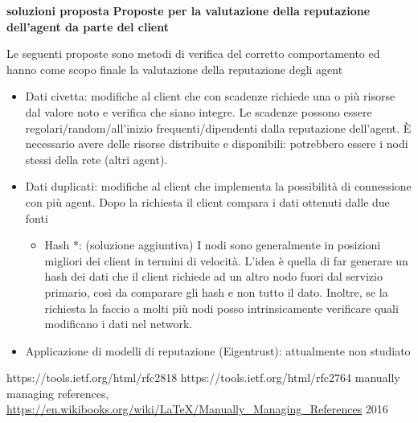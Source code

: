 \documentclass[]{article}
\begin{document}
	\textbf{soluzioni proposta}
	\textbf{Proposte per la valutazione della reputazione dell'agent da parte del client}
	
	Le seguenti proposte sono metodi di verifica del corretto comportamento ed hanno come scopo finale la valutazione della reputazione degli agent
	\begin{itemize}
		\item Dati civetta: modifiche al client che con scadenze richiede una o più risorse dal valore noto e verifica che siano integre. Le scadenze possono essere regolari/random/all’inizio frequenti/dipendenti dalla reputazione dell’agent. È necessario avere delle risorse distribuite e disponibili: potrebbero essere i nodi stessi della rete (altri agent).
		\item Dati duplicati: modifiche al client che implementa la possibilità di connessione con più agent. Dopo la richiesta il client compara i dati ottenuti dalle due fonti
		\begin{itemize}
			\item Hash *: (soluzione aggiuntiva) I nodi sono generalmente in posizioni migliori dei client in termini di velocità. L’idea è quella di far generare un hash dei dati che il client richiede ad un altro nodo fuori dal servizio primario, così da comparare gli hash e non tutto il dato.
			Inoltre, se la richiesta la faccio a molti più nodi posso intrinsicamente verificare quali modificano i dati nel network.
		\end{itemize}
		\item Applicazione di modelli di reputazione (Eigentrust): attualmente non studiato
	\end{itemize}

	
	\begin{thebibliography}{1}
			https://tools.ietf.org/html/rfc2818
			https://tools.ietf.org/html/rfc2764
			manually managing references, 
			\url{https://en.wikibooks.org/wiki/LaTeX/Manually_Managing_References}
			2016
	\end{thebibliography}
		
	\pagebreak
	
	
\end{document}
